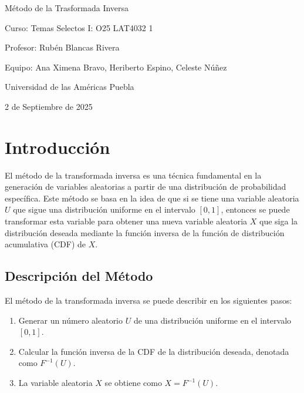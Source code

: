 \documentclass[10pt,a4paper]{article}
\let\oldsection\section
\renewcommand{\section}{%
      \clearpage
      \thispagestyle{myfancy}%
      \oldsection
    }
\begin{document}
    \begin{titlepage}
    \centering
    \vspace*{4cm}
    {\extrabold\fontsize{28pt}{28pt}\selectfont Método de la Trasformada Inversa\par}
    \vspace{1cm}
    
    {\medium\fontsize{12pt}{12pt}\selectfont
    {\large Curso:  Temas Selectos I: O25 LAT4032 1\par}
    {\large Profesor:  Rubén Blancas Rivera\par}
    {\large Equipo: Ana Ximena Bravo, Heriberto Espino, Celeste Núñez\par}
    {\large Universidad de las Américas Puebla\par}
    \vfill
    {\large 2 de Septiembre de 2025 \par}}
    \end{titlepage}


    \renewcommand{\contentsname}{Índice}
    \tableofcontents
    \thispagestyle{empty}
    \newpage

    \setcounter{page}{1}
    \section{Introducción}
    El método de la transformada inversa es una técnica fundamental en la generación de variables aleatorias a partir de una distribución de probabilidad específica. Este método se basa en la idea de que si se tiene una variable aleatoria \( U \) que sigue una distribución uniforme en el intervalo \([0, 1]\), entonces se puede transformar esta variable para obtener una nueva variable aleatoria \( X \) que siga la distribución deseada mediante la función inversa de la función de distribución acumulativa (CDF) de \( X \).

    \subsection{Descripción del Método}
    El método de la transformada inversa se puede describir en los siguientes pasos:
    \begin{enumerate}
        \item Generar un número aleatorio \( U \) de una distribución uniforme en el intervalo \([0, 1]\).
        \item Calcular la función inversa de la CDF de la distribución deseada, denotada como \( F^{-1}(U) \).
        \item La variable aleatoria \( X \) se obtiene como \( X = F^{-1}(U) \).
    \end{enumerate}
\end{document}
